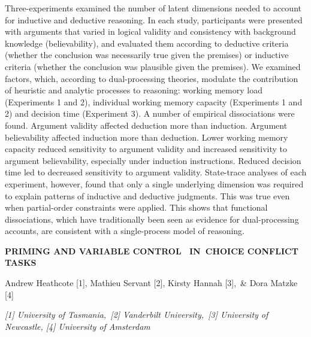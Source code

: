 \documentclass[]{article}
\begin{document}
Three-experiments examined the number of latent dimensions needed to
account for inductive and deductive reasoning. In each study,
participants were presented with arguments that varied in logical
validity and consistency with background knowledge (believability), and
evaluated them according to deductive criteria (whether the conclusion
was necessarily true given the premises) or inductive criteria (whether
the conclusion was plausible given the premises). We examined factors,
which, according to dual-processing theories, modulate the contribution
of heuristic and analytic processes to reasoning: working memory load
(Experiments 1 and 2), individual working memory capacity (Experiments 1
and 2) and decision time (Experiment 3). A number of empirical
dissociations were found. Argument validity affected deduction more than
induction. Argument believability affected induction more than
deduction. Lower working memory capacity reduced sensitivity to argument
validity and increased sensitivity to argument believability, especially
under induction instructions. Reduced decision time led to decreased
sensitivity to argument validity. State-trace analyses of each
experiment, however, found that only a single underlying dimension was
required to explain patterns of inductive and deductive judgments. This
was true even when partial-order constraints were applied. This shows
that functional dissociations, which have traditionally been seen as
evidence for dual-processing accounts, are consistent with a
single-process model of reasoning.

\textbf{PRIMING AND VARIABLE CONTROL~ IN~CHOICE CONFLICT TASKS}

Andrew Heathcote {[}1{]}, Mathieu Servant {[}2{]}, Kirsty Hannah
{[}3{]},~\& Dora Matzke {[}4{]}

\emph{{[}1{]} University of Tasmania,~{[}2{]} Vanderbilt
University,~{[}3{]} University of Newcastle, {[}4{]} University of
Amsterdam}
\end{document}
